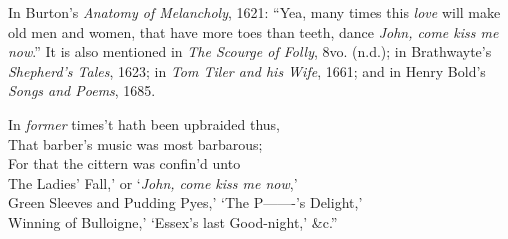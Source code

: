 In Burton’s \textit{Anatomy of Melancholy}, 1621: “Yea, many times this \textit{love} will
make old men and women, that have more toes than teeth, dance \textit{John, come kiss
me now}.” It is also mentioned in \textit{The Scourge of Folly}, 8vo. (n.d.); in Brathwayte’s
\textit{Shepherd’s Tales}, 1623; in \textit{Tom Tiler and his Wife}, 1661; and in Henry
Bold’s \textit{Songs and Poems}, 1685.
\pagebreak

\begin{scverse}In \textit{former} times’t hath been upbraided thus,\\
That barber’s music was most barbarous;\\
For that the cittern was confin’d unto\\
The Ladies’ Fall,’ or ‘\textit{John, come kiss me now},’\\
Green Sleeves and Pudding Pyes,’ ‘The P-------’s Delight,’\\
Winning of Bulloigne,’ ‘Essex’s last Good-night,’ \&c.”
\end{scverse}

